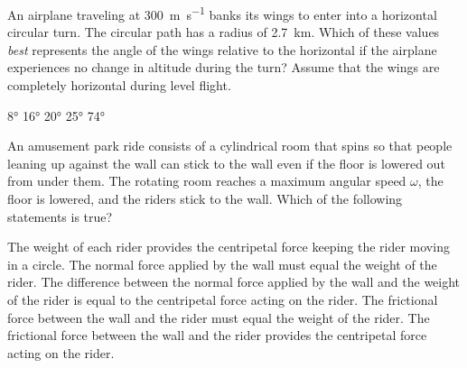 \documentclass{../../oss-apphys-exam}
\begin{document}
\begin{multicols*}{2}
\begin{questions}
    \columnbreak
    
    \question An airplane traveling at \SI{300}{\metre\per\second} banks its
    wings to enter into a horizontal circular turn. The circular path has a
    radius of \SI{2.7}{\kilo\metre}. Which of these values \emph{best}
    represents the angle of the wings relative to the horizontal if the airplane
    experiences no change in altitude during the turn? Assume that the wings
    are completely horizontal during level flight.
    \begin{choices}
      \choice\ang{8}
      \choice\ang{16}
      \choice\ang{20}
      \choice\ang{25}
      \correctchoice\ang{74}
    \end{choices}

    
    \question An amusement park ride consists of a cylindrical room that spins
    so that people leaning up against the wall can stick to the wall even if the
    floor is lowered out from under them. The rotating room reaches a maximum
    angular speed $\omega$, the floor is lowered, and the riders stick to
    the wall. Which of the following statements is true?
    \begin{choices}
      \choice The weight of each rider provides the centripetal force keeping
      the rider moving in a circle.
      \choice The normal force applied by the wall must equal the weight of the
      rider.
      \choice The difference between the normal force applied by the wall and
      the weight of the rider is equal to the centripetal force acting on the
      rider.
      \choice The frictional force between the wall and the rider must equal the
      weight of the rider.
      \choice The frictional force between the wall and the rider provides the
      centripetal force acting on the rider.
    \end{choices}


\end{questions}
\end{multicols*}
\end{document}
